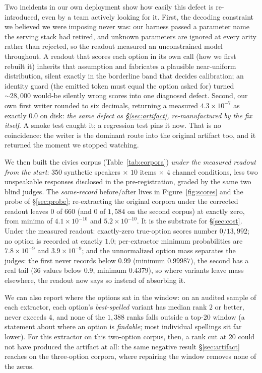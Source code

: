 \documentclass{article}
\newif\ifclaimtags\claimtagsfalse
\newcommand{\ct}[1]{\ifclaimtags\hfill{\scriptsize\textcolor{gray}{[#1]}}\fi}
\begin{document}
Two incidents in our own deployment show how easily this defect is
re-introduced, even by a team actively looking for it. First, the decoding
constraint we believed we were imposing never was: our harness passed a parameter
name the serving stack had retired, and unknown parameters are ignored at every
arity rather than rejected, so the readout measured an unconstrained model
throughout.\ct{C64} A readout that scores each option in its own call (how we first rebuilt it) inherits that assumption and fabricates a
plausible near-uniform distribution, silent exactly in the
borderline band that decides calibration; an identity guard (the emitted token must equal the option asked for) turned ${\sim}28{,}000$ would-be silently wrong
scores into one diagnosed defect.\ct{C7} Second, our own first writer rounded to
six decimals, returning a measured $4.3\times10^{-7}$ as exactly $0.0$ on disk:
\emph{the same defect as \S\ref{sec:artifact}, re-manufactured by the fix
itself}. A smoke test caught it; a regression test pins it now. That is no coincidence: the writer is the dominant route into the original artifact too, and it
returned the moment we stopped watching.\ct{C12, C62}

We then built the civics corpus (Table~\ref{tab:corpora}) \emph{under the measured readout from
the start}: $350$ synthetic speakers $\times$ $10$ items $\times$
$4$ channel conditions, less two unspeakable
responses disclosed in the pre-registration, graded by the same two blind judges. The \emph{same-record} before/after lives in Figure~\ref{fig:scores} and the probe
of \S\ref{sec:probe}; re-extracting the original corpora under the corrected
readout leaves $0$ of $660$ (and $0$ of $1{,}584$ on the second corpus) at
exactly zero, from minima of $4.1\times10^{-10}$ and $5.2\times10^{-10}$. It is the substrate for \S\ref{sec:cost}. Under
the measured readout: exactly-zero true-option scores number
$0/13{,}992$; no option is recorded at exactly $1.0$; per-extractor
minimum probabilities are $7.8\times10^{-9}$ and $3.9\times10^{-9}$; and the
unnormalized option mass separates the judges: the first never records below
$0.99$ (minimum $0.99987$), the second has a real tail ($36$ values below $0.9$,
minimum $0.4379$), so where variants leave mass elsewhere, the readout now says
so instead of absorbing it.

We can also report where the options sat in the
window: on an audited sample of each extractor, each
option's \emph{best-spelled} variant has median rank $2$ or better, never
exceeds $4$, and none of the $1{,}388$ ranks falls outside a top-$20$
window (a statement about where an option is \emph{findable}; most individual
spellings sit far lower). For this extractor on this
two-option corpus, then, a rank cut at $20$ could not have produced the artifact at all: the same negative result \S\ref{sec:artifact} reaches on the
three-option corpora, where repairing the window removes none of the zeros.\ct{C8--C11, C44, C63}
\end{document}

